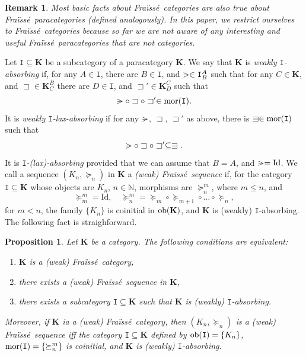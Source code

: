 \documentclass[12pt]{amsart}
\numberwithin{equation}{section}
\theoremstyle{plain}
\newtheorem{remark}[theorem]{\bf Remark}
\newtheorem{proposition}[theorem]{\bf Proposition}
\theoremstyle{definition}
\newcommand{\nil}{\mathrel{\vphantom{>}\text{\mathsurround=0pt\ooalign{$>$\cr$-$\cr}}}}
\newcommand{\sqni}{\mathrel{\vphantom{\sqsupset}\text{\mathsurround=0pt\ooalign{$\sqsupset$\cr$-$\cr}}}}
\newcommand \Id{ \mbox{Id}}
\newcommand \sqsp{\sqsupset}
\newcommand \mor{{\rm{mor}}}
\newcommand \ob{{\rm{ob}}}
\newcommand \fra{Fra\"{i}ss\'{e}}
\newcommand \KKb{\mathbf{K}}
\newcommand \NN{\mathbb{N}}
\newcommand \It{\mathtt{I}}
\begin{document}
 \begin{remark}
Most basic facts about \fra \ categories are also true about \fra \ paracategories (defined analogously). In this paper, we restrict ourselves to \fra \ categories because so far we are not aware of any interesting and useful \fra \ paracategories that are not categories.
 \end{remark}
 
Let $\It \subseteq \KKb$ be a subcategory of a paracategory $\KKb$. We say that $\KKb$ is \emph{weakly $\It$-absorbing} if, for any $A \in \It $, there are $B \in \It$, and $\nil \in \It^A_{B}$ such that for any $C \in \KKb$, and $\sqsp \in \KKb^B_{C}$ there are $D \in \It$, and $\sqsp' \in \KKb^{C}_D$ such that $$\nil \circ \sqsp \circ \sqsp' \in \mor(\It).$$ It is \emph{weakly $\It$-lax-absorbing} if for any $\nil$, $\sqsp$, $\sqsp'$ as above, there is $\sqni \in \mor(\It)$ such that $$\nil \circ \sqsp \circ \sqsp' \subseteq \sqni.$$ 
%
It is  \emph{$\It$-(lax)-absorbing} provided that we can assume that $B=A$, and $\nil=\Id$. We call a sequence $(K_n, \succeq_n)$ in $\KKb$ a \emph{(weak) \fra \ sequence} if, for the category $\It \subseteq \KKb$ whose objects are $K_n$, $n \in \NN$, morphisms are $\succeq^m_n$, where $m \leq n$, and $$\succeq^m_m=\Id, \quad \succeq^m_n= \succeq_m \circ \succeq_{m+1} \circ \ldots \circ \succeq_n,$$ for $m<n$, the family $\{K_n\}$  is coinitial in $\ob(\KKb)$, and $\KKb$ is (weakly) $\It$-absorbing. The following fact is straighforward.

\begin{proposition}
\label{pr:FraConditions}
Let $\KKb$ be a category. The following conditions are equivalent:
\begin{enumerate}
\item $\KKb$ is a (weak) \fra \ category,
\item there exists a (weak) \fra \ sequence in $\KKb$,
\item there exists a subcategory $\It \subseteq \KKb$ such that $\KKb$ is (weakly) $\It$-absorbing.
\end{enumerate}
Moreover, if $\KKb$ ia a (weak) \fra \ category, then $(K_n,\succeq_n)$ is a (weak) \fra \ sequence iff the category $\It \subseteq \KKb$ defined by $\ob(\It)=\{K_n\}$, $\mor(\It)=\{\succeq^m_n\}$ is coinitial, and $\KKb$ is (weakly) $\It$-absorbing.	
\end{proposition}
\end{document}
